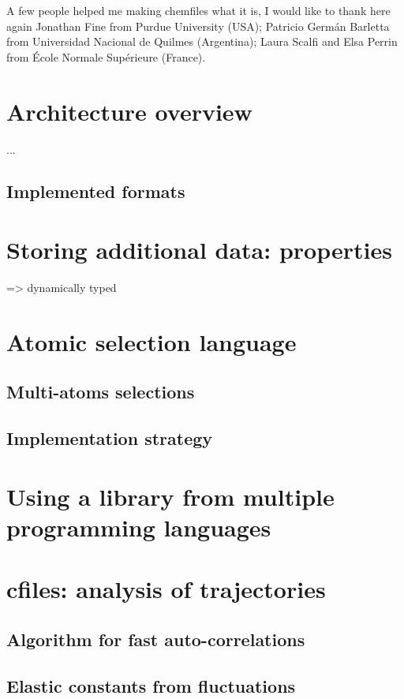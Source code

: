 \documentclass[thesis]{subfiles}
\begin{document}
A few people helped me making chemfiles what it is, I would like to thank here
again Jonathan Fine from Purdue University (USA); Patricio Germán Barletta from
Universidad Nacional de Quilmes (Argentina); Laura Scalfi and Elsa Perrin from
École Normale Supérieure (France).

\section{Architecture overview}

...

\subsection{Implemented formats}

\section{Storing additional data: properties}

=> dynamically typed

\section{Atomic selection language}

\subsection{Multi-atoms selections}

\subsection{Implementation strategy}

\section{Using a library from multiple programming languages}

\section{cfiles: analysis of trajectories}

\subsection{Algorithm for fast auto-correlations}

\subsection{Elastic constants from fluctuations}

\OnlyInSubfile{\printbibliography}
\end{document}
